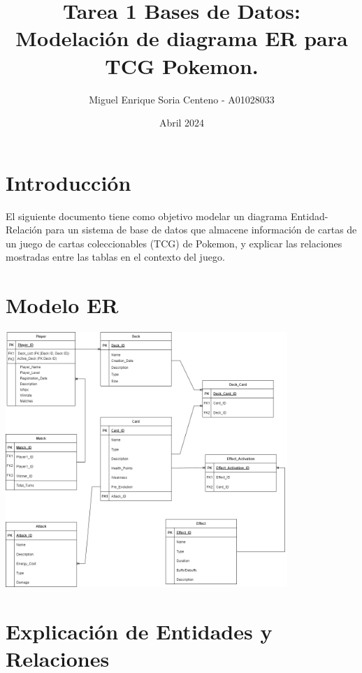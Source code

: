 \documentclass{article}
\title{Tarea 1 Bases de Datos: Modelación de diagrama ER para TCG Pokemon.}
\author{Miguel Enrique Soria Centeno - A01028033}
\date{Abril 2024}
\begin{document}
\maketitle

\section{Introducción}
El siguiente documento tiene como objetivo modelar un diagrama Entidad-Relación para un sistema de base de datos que almacene información de cartas de un juego de cartas coleccionables (TCG) de Pokemon, y explicar las relaciones mostradas entre las tablas en el contexto del juego. 

\section{Modelo ER}
\begin{center}
  \includegraphics[width=0.8\textwidth]{PokemonTCG_ER.png}
\end{center}

\section{Explicación de Entidades y Relaciones}
\end{document}
